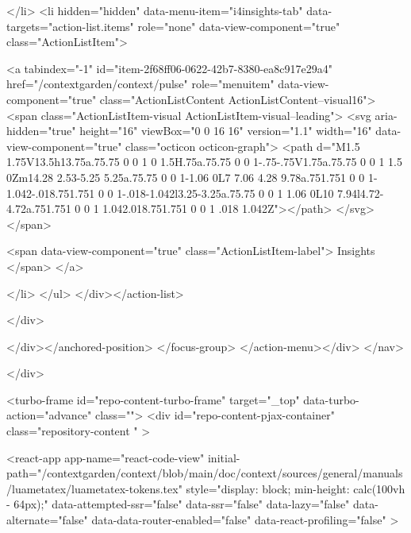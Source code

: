 </li>
        <li hidden="hidden" data-menu-item="i4insights-tab" data-targets="action-list.items" role="none" data-view-component="true" class="ActionListItem">
    
    
    <a tabindex="-1" id="item-2f68ff06-0622-42b7-8380-ea8c917e29a4" href="/contextgarden/context/pulse" role="menuitem" data-view-component="true" class="ActionListContent ActionListContent--visual16">
        <span class="ActionListItem-visual ActionListItem-visual--leading">
          <svg aria-hidden="true" height="16" viewBox="0 0 16 16" version="1.1" width="16" data-view-component="true" class="octicon octicon-graph">
    <path d="M1.5 1.75V13.5h13.75a.75.75 0 0 1 0 1.5H.75a.75.75 0 0 1-.75-.75V1.75a.75.75 0 0 1 1.5 0Zm14.28 2.53-5.25 5.25a.75.75 0 0 1-1.06 0L7 7.06 4.28 9.78a.751.751 0 0 1-1.042-.018.751.751 0 0 1-.018-1.042l3.25-3.25a.75.75 0 0 1 1.06 0L10 7.94l4.72-4.72a.751.751 0 0 1 1.042.018.751.751 0 0 1 .018 1.042Z"></path>
</svg>
        </span>
      
        <span data-view-component="true" class="ActionListItem-label">
          Insights
</span>      
</a>
  
</li>
</ul>    
</div></action-list>


</div>
      
</div></anchored-position>  </focus-group>
</action-menu></div>
</nav>

  </div>

  



<turbo-frame id="repo-content-turbo-frame" target="_top" data-turbo-action="advance" class="">
    <div id="repo-content-pjax-container" class="repository-content " >
    



    
      
    








<react-app
  app-name="react-code-view"
  initial-path="/contextgarden/context/blob/main/doc/context/sources/general/manuals/luametatex/luametatex-tokens.tex"
    style="display: block; min-height: calc(100vh - 64px);"
  data-attempted-ssr="false"
  data-ssr="false"
  data-lazy="false"
  data-alternate="false"
  data-data-router-enabled="false"
  data-react-profiling="false"
>
  
